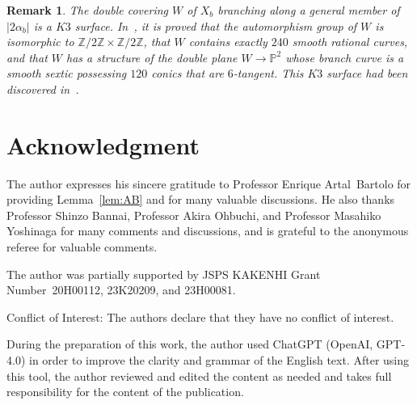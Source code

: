 \documentclass{math}
\theoremstyle{plain}
\newtheorem{remark}[theorem]{Remark}
\numberwithin{equation}{section}
\newcommand{\PP}{\mathord{\mathbb  P}}
\newcommand{\ZZ}{\mathord{\mathbb Z}}
\begin{document}
%
\begin{remark}\label{rem:K3}
The double covering $W$ of $X_b$ branching along a general member of $|2\alpha_b|$
is a $K3$ surface.
In~\cite{Roulleau2022}, it is proved that the automorphism group of $W$ is isomorphic to $ \ZZ/2\ZZ\times\ZZ/2\ZZ$, 
that $W$ contains exactly  $240$ smooth rational curves, and that 
 $W$ has a structure of the double plane $W\to\PP^2$
whose branch curve is a smooth sextic possessing  $120$  conics that are $6$-tangent.
This $K3$ surface had been discovered in~\cite{Kondo1989}.
\end{remark}



\section*{Acknowledgment}
The author expresses his sincere gratitude to
Professor Enrique Artal~Bartolo for providing Lemma~\ref{lem:AB} and for many valuable discussions.
He also thanks
Professor Shinzo Bannai, Professor Akira Ohbuchi, and Professor Masahiko Yoshinaga
for many comments and discussions, and is grateful to the anonymous referee for valuable comments.
\par
The author  was partially supported by JSPS KAKENHI Grant Number~20H00112, 23K20209, and 23H00081.
\par
Conflict of Interest: The authors declare that they have no conflict of interest.
\par
During the preparation of this work, the author used ChatGPT (OpenAI, GPT-4.0) in order to improve the clarity and grammar of the English text. 
After using this tool, the author reviewed and edited the content as needed and takes full responsibility for the content of the publication.
\end{document}
